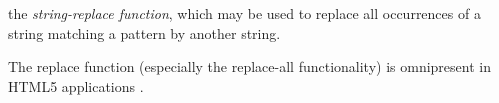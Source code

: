 %
%

the \emph{string-replace function}, 
which may be used to replace all occurrences of a string matching a pattern by 
another string. 

The replace function (especially 
the replace-all functionality) is omnipresent in HTML5 applications
\cite{LB16,TCJ16,YABI14}. 


